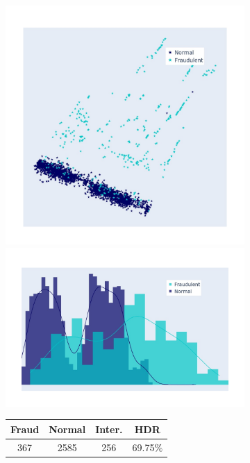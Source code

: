\begin{figure}[h!]
	\centering
	\begin{subfigure}[]{0.3\linewidth}	
		\includegraphics[width=\linewidth,trim=40 40 40 40]{Figures/creditcard/PCA/RawData-data-run-0-0}
		\includegraphics[width=\linewidth,trim=40 40 40 40]{Figures/creditcard/PCA/RawData-data-run-0-0_DIST}
		\begin{tabular}{c|c|c|c}
			Fraud & Normal & Inter. & HDR  \\
			\hline
			367  & 2585  & 256 & 69.75\(\%\) \\

\end{tabular}
\end{subfigure}
\end{figure}
